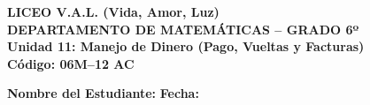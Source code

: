 \documentclass[11pt, letterpaper]{article}
\begin{document}
	
	\begin{center}
		{\Large \textbf{LICEO V.A.L. (Vida, Amor, Luz)}}\\[0.1cm]
		{\large \textbf{DEPARTAMENTO DE MATEMÁTICAS -- GRADO 6º}}\\[0.1cm]
		{\large \textbf{Unidad 11: Manejo de Dinero (Pago, Vueltas y Facturas)}}\\[0.1cm]
		{\small \hfill \textbf{Código: 06M--12 AC}}
	\end{center}
	
	\vspace{0.2cm}
	\noindent \textbf{Nombre del Estudiante:} \underline{\hspace{8.5cm}} \textbf{Fecha:} \underline{\hspace{3cm}}
	\vspace{0.3cm}
	
\end{document}
